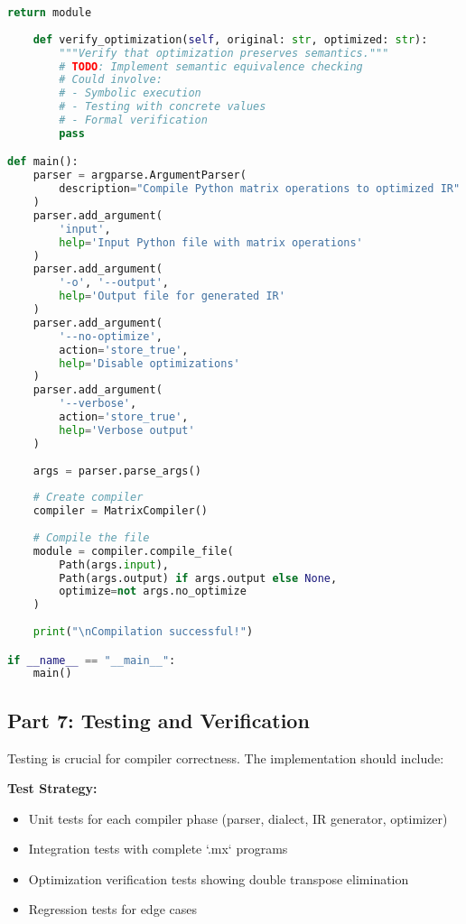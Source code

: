 \documentclass[11pt,a4paper]{article}
\begin{document}
\begin{lstlisting}[language=Python, caption=compiler.py - Main Compiler Driver]
        return module
    
    def verify_optimization(self, original: str, optimized: str):
        """Verify that optimization preserves semantics."""
        # TODO: Implement semantic equivalence checking
        # Could involve:
        # - Symbolic execution
        # - Testing with concrete values
        # - Formal verification
        pass

def main():
    parser = argparse.ArgumentParser(
        description="Compile Python matrix operations to optimized IR"
    )
    parser.add_argument(
        'input',
        help='Input Python file with matrix operations'
    )
    parser.add_argument(
        '-o', '--output',
        help='Output file for generated IR'
    )
    parser.add_argument(
        '--no-optimize',
        action='store_true',
        help='Disable optimizations'
    )
    parser.add_argument(
        '--verbose',
        action='store_true',
        help='Verbose output'
    )
    
    args = parser.parse_args()
    
    # Create compiler
    compiler = MatrixCompiler()
    
    # Compile the file
    module = compiler.compile_file(
        Path(args.input),
        Path(args.output) if args.output else None,
        optimize=not args.no_optimize
    )
    
    print("\nCompilation successful!")

if __name__ == "__main__":
    main()
\end{lstlisting}

\subsection{Part 7: Testing and Verification}

Testing is crucial for compiler correctness. The implementation should include:

\textbf{Test Strategy:}
\begin{itemize}
    \item Unit tests for each compiler phase (parser, dialect, IR generator, optimizer)
    \item Integration tests with complete `.mx` programs
    \item Optimization verification tests showing double transpose elimination
    \item Regression tests for edge cases
\end{itemize}
\end{document}
